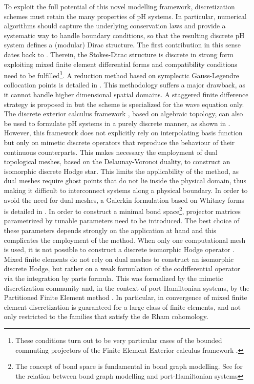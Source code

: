 \documentclass{elsarticle}
\newcommand{\revTwo}[1]{{\color{black}#1}}
\begin{document}
To exploit the full potential of this novel modelling framework, discretization schemes must retain the many properties of pH systems. In particular, numerical algorithms should capture the underlying conservation laws and provide a systematic way to handle boundary conditions, so that the resulting discrete pH system defines a (modular) Dirac structure. The first contribution in this sense dates back to \cite{golo2004hamiltonian}. Therein, the Stokes-Dirac structure is discrete in strong form exploiting mixed finite element differential forms and compatibility conditions need to be fulfilled\footnote{These conditions turn out to be very particular cases of the bounded commuting projectors of the Finite Element Exterior calculus framework \cite{arnold2006acta}.}.
A reduction method based on symplectic Gauss-Legendre collocation points is detailed in \cite{moulla2012pseudo}. This methodology suffers a major drawback, as it cannot handle higher dimensional spatial domains. A staggered finite difference strategy is proposed in \cite{trenchant2018} but the scheme is specialized for the wave equation only. The discrete exterior calculus framework \cite{hirani2003discrete}, based on algebraic topology, can also be used to formulate pH systems in a purely discrete manner, as shown in \cite{seslija2014simplicial}. However, this framework does not \revTwo{explicitly} rely on interpolating basis function but only on  mimetic discrete operators that reproduce the behaviour of their continuous counterparts. This makes necessary the employment of dual topological meshes, based on the Delaunay-Voronoi duality, to construct an isomorphic discrete Hodge star. This limits the applicability of the method, as dual meshes require ghost points that do not lie inside the physical domain, thus making it difficult to interconnect systems along a physical boundary. In order to avoid the need for dual meshes, a Galerkin formulation based on Whitney forms is detailed in \cite{kotyczka2018weak}. In order to construct a minimal bond space\footnote{\revTwo{The concept of bond space is fundamental in bond graph modelling. See \cite{vanderschaft2014port} for the relation between bond graph modelling and port-Hamiltonian systems}}, projector matrices parametrized by tunable parameters need to be introduced. The best choice of these parameters depends strongly on the application at hand and this complicates the employment of the method. When only one computational mesh is used, it is not possible to construct a discrete isomorphic Hodge operator \cite{hiptmair2001,bochev2006}.
\revTwo{Mixed finite elements do not rely on dual meshes to construct an isomorphic discrete Hodge, but rather on a weak formulation of the codifferential operator via the integration by parts formula. This was formalized by the mimetic discretization community \cite{bossavit2000,bochev2006,arnold2006acta} and, in the context of port-Hamiltonian systems, by the Partitioned Finite Element method \cite{cardoso2020pfem}. In particular, in \cite{haine2020numerical} convergence of mixed finite element discretization is guaranteed for a large class of finite elements, and not only restricted to the families that satisfy the de Rham cohomology}. \\
\end{document}
